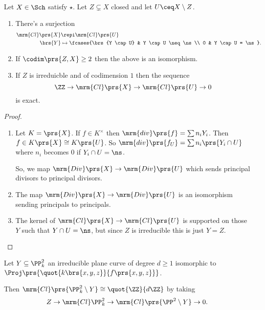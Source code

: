 \documentclass[10pt,a4paper,twoside,openany,hidelinks]{book}
\begin{document}
\begin{proposition}
Let $X \in \Sch$ satisfy $\star$.
Let $Z \subsetneq X$ closed and let $U \ceq X \setminus Z$.

\begin{enumerate}
\item There's a surjection
\begin{align*}
\mrm{Cl}\prs{X} &\repi \mrm{Cl}\prs{U} \\
\brs{Y} &\mapsto \fcases{\brs{Y \cap U} & Y \cap U \neq \ns \\
0 & Y \cap U = \ns} \text{.}
\end{align*}

\item If $\codim\prs{Z, X} \geq 2$ then the above is an isomorphism.

\item If $Z$ is irreduicble and of codimension $1$ then the sequence
\[\ZZ \to \mrm{Cl}\prs{X} \to \mrm{Cl}\prs{U} \to 0\]
is exact.
\end{enumerate}
\end{proposition}

\begin{proof}
\begin{enumerate}
\item Let $K = \prs{X}$. If $f \in K^\times$ then $\mrm{div}\prs{f} = \sum n_i Y_i$. Then $f \in K\prs{X} \cong K\prs{U}$.
So $\mrm{div}\prs{f_U} = \sum n_i \prs{Y_i \cap U}$ where $n_i$ becomes $0$ if $Y_i \cap U = \ns$.

So, we map $\mrm{Div}\prs{X} \to \mrm{Div}\prs{U}$ which sends principal divisors to principal divisors.

\item The map $\mrm{Div}\prs{X} \to \mrm{Div}\prs{U}$
is an isomorphism sending principals to principals.

\item The kernel of $\mrm{Cl}\prs{X} \to \mrm{Cl}\prs{U}$ is supported on those $Y$ such that $Y \cap U = \ns$, but since $Z$ is irreducible this is just $Y = Z$.
\end{enumerate}
\end{proof}

\begin{example}
Let $Y \subseteq \PP_k^2$ an irreducible plane curve of degree $d \geq 1$ isomorphic to $\Proj\prs{\quot{k\brs{x,y,z}}{f\prs{x,y,z}}}$.

Then $\mrm{Cl}\prs{\PP_k^2 \setminus Y} \cong \quot{\ZZ}{d\ZZ}$
by taking
\[Z \to \mrm{Cl}\PP_k^2 \to \mrm{Cl}\prs{\PP^2 \setminus Y} \to 0 \text{.}\]
\end{example}
\end{document}
